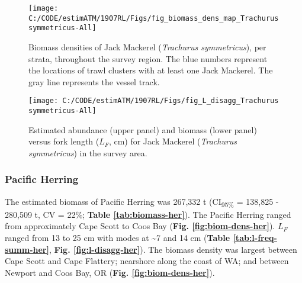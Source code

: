 \documentclass[]{article}
\begin{document}
\begin{figure}[H]

{\centering \texttt{[image: C:/CODE/estimATM/1907RL/Figs/fig\_biomass\_dens\_map\_Trachurus symmetricus-All]} 

}

\caption{Biomass densities of Jack Mackerel (\emph{Trachurus symmetricus}), per strata, throughout the survey region. The blue numbers represent the locations of trawl clusters with at least one Jack Mackerel. The gray line represents the vessel track.}\label{fig:biom-dens-jack}
\end{figure}

\newpage



\begin{figure}[H]

{\centering \texttt{[image: C:/CODE/estimATM/1907RL/Figs/fig\_L\_disagg\_Trachurus symmetricus-All]} 

}

\caption{Estimated abundance (upper panel) and biomass (lower panel) versus fork length (\(L_F\), cm) for Jack Mackerel (\emph{Trachurus symmetricus}) in the survey area.}\label{fig:l-disagg-jack}
\end{figure}

\newpage

\hypertarget{results-herring}{%
\subsubsection{Pacific Herring}\label{results-herring}}

The estimated biomass of Pacific Herring was 267,332 t (CI\textsubscript{95\%} = 138,825 - 280,509 t, CV = 22\%; \textbf{Table \ref{tab:biomass-her}}). The Pacific Herring ranged from approximately Cape Scott to Coos Bay (\textbf{Fig. \ref{fig:biom-dens-her}}). \(L_F\) ranged from 13 to 25 cm with modes at \textasciitilde7 and 14 cm (\textbf{Table \ref{tab:l-freq-summ-her}}, \textbf{Fig. \ref{fig:l-disagg-her}}). The biomass density was largest between Cape Scott and Cape Flattery; nearshore along the coast of WA; and between Newport and Coos Bay, OR (\textbf{Fig. \ref{fig:biom-dens-her}}).
\end{document}
